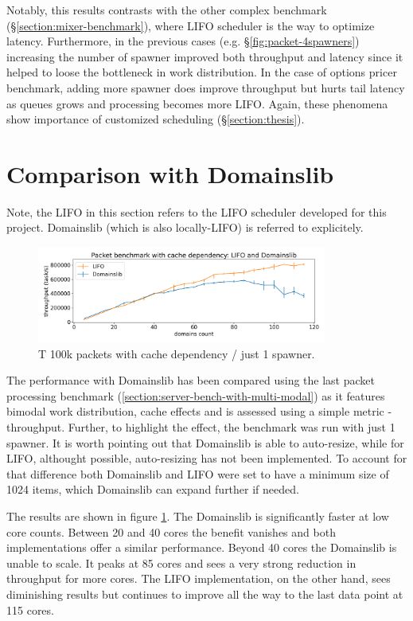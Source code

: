 \documentclass[12pt,a4paper,twoside]{report}
\begin{document}
Notably, this results contrasts with the other complex benchmark (\S\ref{section:mixer-benchmark}), where LIFO scheduler is the way to optimize latency. Furthermore, in the previous cases (e.g. \S\ref{fig:packet-4spawners}) increasing the number of spawner improved both throughput and latency since it helped to loose the bottleneck in work distribution. In the case of options pricer benchmark, adding more spawner does improve throughput but hurts tail latency as queues grows and processing becomes more LIFO. Again, these phenomena show importance of customized scheduling (\S\ref{section:thesis}).

\section{Comparison with Domainslib}
\label{section:result_with_domainslib}

Note, the LIFO in this section refers to the LIFO scheduler developed for this project. Domainslib (which is also locally-LIFO) is referred to explicitely.

\begin{figure} 
    \centering 
    \includegraphics[width=0.85\textwidth]{eval/comp-base4.png}
    \caption{T 100k packets with cache dependency / just 1 spawner.}
   \label{fig:domainslib-comp}
\end{figure}

The performance with Domainslib has been compared using the last packet processing benchmark (\ref{section:server-bench-with-multi-modal}) as it features bimodal work distribution, cache effects and is assessed using a simple metric - throughput. Further, to highlight the effect, the benchmark was run with just 1 spawner. It is worth pointing out that Domainslib is able to auto-resize, while for LIFO, althought possible, auto-resizing has not been implemented. To account for that difference both Domainslib and LIFO were set to have a minimum size of 1024 items, which Domainslib can expand further if needed. 

The results are shown in figure \ref{fig:domainslib-comp}. The Domainslib is significantly faster at low core counts. Between 20 and 40 cores the benefit vanishes and both implementations offer a similar performance. Beyond 40 cores the Domainslib is unable to scale. It peaks at 85 cores and sees a very strong reduction in throughput for more cores. The LIFO implementation, on the other hand, sees diminishing results but continues to improve all the way to the last data point at 115 cores.  
\end{document}
